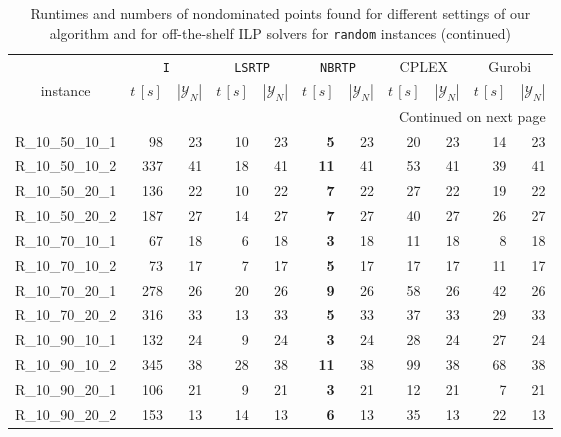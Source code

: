 \documentclass{article}
\begin{document}
\begin{longtable}{lrrrrrrrrrr}
\midrule
\endfirsthead
\caption[]{Runtimes and numbers of nondominated points found for different settings of our algorithm and for off-the-shelf ILP solvers for \texttt{random} instances (continued)}\\
\toprule
  & \multicolumn{2}{c}{\texttt{I}} & \multicolumn{2}{c}{\texttt{LSRTP}} & \multicolumn{2}{c}{\texttt{NBRTP}}  & \multicolumn{2}{c}{CPLEX} & \multicolumn{2}{c}{Gurobi} \\%
  \cmidrule(lr){2-3}\cmidrule(lr){4-5}\cmidrule(lr){6-7}\cmidrule(lr){8-9}\cmidrule(lr){10-11}
\multicolumn{1}{c}{instance} &\multicolumn{1}{c}{$t \,[s]$} & \multicolumn{1}{c}{$|\mathcal{Y}_N|$} &\multicolumn{1}{c}{$t \,[s]$} & \multicolumn{1}{c}{$|\mathcal{Y}_N|$} & \multicolumn{1}{c}{$t \,[s]$} & \multicolumn{1}{c}{$|\mathcal{Y}_N|$} & \multicolumn{1}{c}{$t \,[s]$} & \multicolumn{1}{c}{$|\mathcal{Y}_N|$} & \multicolumn{1}{c}{$t \,[s]$} & \multicolumn{1}{c}{$|\mathcal{Y}_N|$} \\
\midrule
\endhead
\midrule
\multicolumn{11}{r}{Continued on next page} \\
\midrule
\endfoot
\bottomrule
\endlastfoot
R\_10\_50\_10\_1 & 98 & 23 & 10 & 23 & \textbf{5} & 23 & 20 & 23 & 14 & 23 \\
R\_10\_50\_10\_2 & 337 & 41 & 18 & 41 & \textbf{11} & 41 & 53 & 41 & 39 & 41 \\
R\_10\_50\_20\_1 & 136 & 22 & 10 & 22 & \textbf{7} & 22 & 27 & 22 & 19 & 22 \\
R\_10\_50\_20\_2 & 187 & 27 & 14 & 27 & \textbf{7} & 27 & 40 & 27 & 26 & 27 \\
R\_10\_70\_10\_1 & 67 & 18 & 6 & 18 & \textbf{3} & 18 & 11 & 18 & 8 & 18 \\
R\_10\_70\_10\_2 & 73 & 17 & 7 & 17 & \textbf{5} & 17 & 17 & 17 & 11 & 17 \\
R\_10\_70\_20\_1 & 278 & 26 & 20 & 26 & \textbf{9} & 26 & 58 & 26 & 42 & 26 \\
R\_10\_70\_20\_2 & 316 & 33 & 13 & 33 & \textbf{5} & 33 & 37 & 33 & 29 & 33 \\
R\_10\_90\_10\_1 & 132 & 24 & 9 & 24 & \textbf{3} & 24 & 28 & 24 & 27 & 24 \\
R\_10\_90\_10\_2 & 345 & 38 & 28 & 38 & \textbf{11} & 38 & 99 & 38 & 68 & 38 \\
R\_10\_90\_20\_1 & 106 & 21 & 9 & 21 & \textbf{3} & 21 & 12 & 21 & 7 & 21 \\
R\_10\_90\_20\_2 & 153 & 13 & 14 & 13 & \textbf{6} & 13 & 35 & 13 & 22 & 13 \\

\end{longtable}
\end{document}
